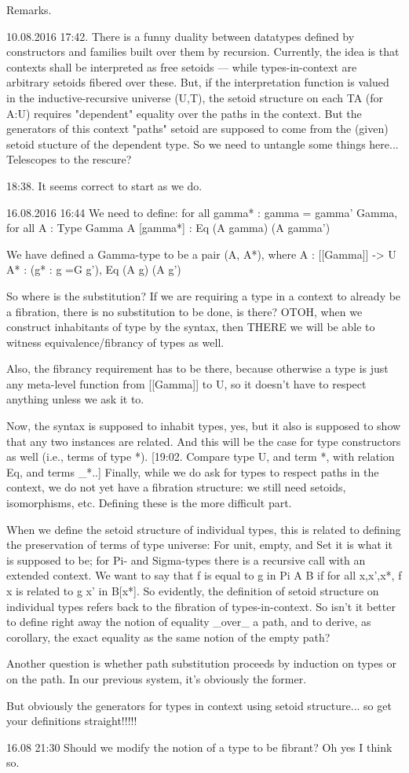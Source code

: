 Remarks.

10.08.2016
17:42.
There is a funny duality between datatypes defined by constructors and families built over them by recursion.
Currently, the idea is that contexts shall be interpreted as free setoids --- while types-in-context are arbitrary setoids fibered over these.
But, if the interpretation function is valued in the inductive-recursive universe (U,T), the setoid structure on each TA (for A:U) requires "dependent" equality over the paths in the context.
But the generators of this context "paths" setoid are supposed to come from the (given) setoid stucture of the dependent type.
So we need to untangle some things here...  Telescopes to the rescure?

18:38.
It seems correct to start as we do.

16.08.2016
16:44
We need to define:
for all gamma* : gamma = gamma' \in Gamma,
for all A : Type Gamma
A [gamma*] : Eq (A gamma) (A gamma')

We have defined a Gamma-type to be a pair (A, A*), where
A : [[Gamma]] -> U
A* : (\forall g* : g =G g'), Eq (A g) (A g')

So where is the substitution?  If we are requiring a type in a context to already be a fibration, there is no substitution to be done, is there?
OTOH, when we construct inhabitants of type by the syntax, then THERE we will be able to witness equivalence/fibrancy of types as well.

Also, the fibrancy requirement has to be there, because otherwise a type is just any meta-level function from [[Gamma]] to U, so it doesn't have to respect anything unless we ask it to.

Now, the syntax is supposed to inhabit types, yes, but it also is supposed to show that any two instances are related.  And this will be the case for type constructors as well (i.e., terms of type *).
[19:02. Compare type U, and term *, with relation Eq, and terms _*..]
Finally, while we do ask for types to respect paths in the context, we do not yet have a fibration structure: we still need setoids, isomorphisms, etc.  Defining these is the more difficult part.

When we define the setoid structure of individual types, this is related to defining the preservation of terms of type universe: For unit, empty, and Set it is what it is supposed to be; for Pi- and Sigma-types there is a recursive call with an extended context.  We want to say that f is equal to g in Pi A B if for all x,x',x*, f x is related to g x' in B[x*].  So evidently, the definition of setoid structure on individual types refers back to the fibration of types-in-context.  So isn't it better to define right away the notion of equality _over_ a path, and to derive, as corollary, the exact equality as the same notion of the empty path?

Another question is whether path substitution proceeds by induction on types or on the path.  In our previous system, it's obviously the former.

But obviously the generators for types in context using setoid structure... so get your definitions straight!!!!!

16.08
21:30
Should we modify the notion of a type to be fibrant?  Oh yes I think so.